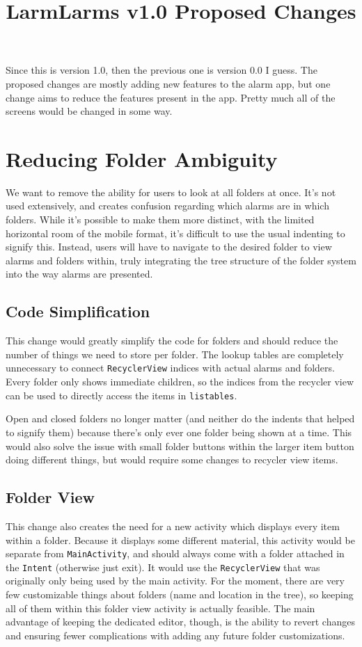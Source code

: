 \documentclass[11pt]{article} %
\title{LarmLarms v1.0 Proposed Changes}
\author{}
\begin{document}
\maketitle

\tableofcontents
\newpage

Since this is version 1.0, then the previous one is version 0.0 I guess. The proposed changes are mostly adding new features to the alarm app, but one change aims to reduce the features present in the app. Pretty much all of the screens would be changed in some way.

\section{Reducing Folder Ambiguity}
We want to remove the ability for users to look at all folders at once. It's not used extensively, and creates confusion regarding which alarms are in which folders. While it's possible to make them more distinct, with the limited horizontal room of the mobile format, it's difficult to use the usual indenting to signify this. Instead, users will have to navigate to the desired folder to view alarms and folders within, truly integrating the tree structure of the folder system into the way alarms are presented.

\subsection{Code Simplification}
\label{sec:folderSimple}
This change would greatly simplify the code for folders and should reduce the number of things we need to store per folder. The lookup tables are completely unnecessary to connect \verb|RecyclerView| indices with actual alarms and folders. Every folder only shows immediate children, so the indices from the recycler view can be used to directly access the items in \verb|listables|.

Open and closed folders no longer matter (and neither do the indents that helped to signify them) because there's only ever one folder being shown at a time. This would also solve the issue with small folder buttons within the larger item button doing different things, but would require some changes to recycler view items.

\subsection{Folder View}
This change also creates the need for a new activity which displays every item within a folder. Because it displays some different material, this activity would be separate from \verb|MainActivity|, and should always come with a folder attached in the \verb|Intent| (otherwise just exit). It would use the \verb|RecyclerView| that was originally only being used by the main activity. For the moment, there are very few customizable things about folders (name and location in the tree), so keeping all of them within this folder view activity is actually feasible. The main advantage of keeping the dedicated editor, though, is the ability to revert changes and ensuring fewer complications with adding any future folder customizations. 
\end{document}
